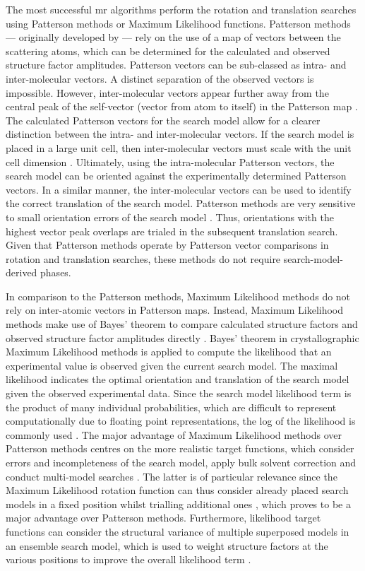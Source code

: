 The most successful \gls{mr} algorithms perform the rotation and translation searches using Patterson methods or Maximum Likelihood functions. Patterson methods --- originally developed by \textcite{Rossmann1962-ou} --- rely on the use of a map of vectors between the scattering atoms, which can be determined for the calculated and observed structure factor amplitudes. Patterson vectors can be sub-classed as intra- and inter-molecular vectors. A distinct separation of the observed vectors is impossible. However, inter-molecular vectors appear further away from the central peak of the self-vector (vector from atom to itself) in the Patterson map \cite{Rupp2010-nc}. The calculated Patterson vectors for the search model allow for a clearer distinction between the intra- and inter-molecular vectors. If the search model is placed in a large unit cell, then inter-molecular vectors must scale with the unit cell dimension \cite{Rupp2010-nc}. Ultimately, using the intra-molecular Patterson vectors, the search model can be oriented against the experimentally determined Patterson vectors. In a similar manner, the inter-molecular vectors can be used to identify the correct translation of the search model. Patterson methods are very sensitive to small orientation errors of the search model \cite{Rupp2010-nc}. Thus, orientations with the highest vector peak overlaps are trialed in the subsequent translation search. Given that Patterson methods operate by Patterson vector comparisons in rotation and translation searches, these methods do not require search-model-derived phases.

In comparison to the Patterson methods, Maximum Likelihood methods do not rely on inter-atomic vectors in Patterson maps. Instead, Maximum Likelihood methods make use of Bayes' theorem \cite{Bayes1763-ox} to compare calculated structure factors and observed structure factor amplitudes directly \cite{Read2001-nu}. Bayes' theorem in crystallographic Maximum Likelihood methods is applied to compute the likelihood that an experimental value is observed given the current search model. The maximal likelihood indicates the optimal orientation and translation of the search model given the observed experimental data. Since the search model likelihood term is the product of many individual probabilities, which are difficult to represent computationally due to floating point representations, the log of the likelihood is commonly used \cite{Rupp2010-nc}. The major advantage of Maximum Likelihood methods over Patterson methods centres on the more realistic target functions, which consider errors and incompleteness of the search model, apply bulk solvent correction and conduct multi-model searches \cite{Read2001-nu}. The latter is of particular relevance since the Maximum Likelihood rotation function can thus consider already placed search models in a fixed position whilst trialling additional ones \cite{Storoni2004-ed}, which proves to be a major advantage over Patterson methods.  Furthermore, likelihood target functions can consider the structural variance of multiple superposed models in an ensemble search model, which is used to weight structure factors at the various positions to improve the overall likelihood term \cite{Read2001-nu}. 

